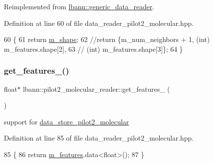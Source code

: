 Reimplemented from \hyperlink{classlbann_1_1generic__data__reader_ae06ff27459ac4a5d8ac14655d4b31318}{lbann\+::generic\+\_\+data\+\_\+reader}.



Definition at line 60 of file data\+\_\+reader\+\_\+pilot2\+\_\+molecular.\+hpp.


\begin{DoxyCode}
60                                                       \{
61     \textcolor{keywordflow}{return} \hyperlink{classlbann_1_1pilot2__molecular__reader_ae02769bc68f1e079c740f724ec6bd0c0}{m\_shape};
62     \textcolor{comment}{//return \{m\_num\_neighbors + 1, (int) m\_features.shape[2],}
63     \textcolor{comment}{//    (int) m\_features.shape[3]\};}
64   \}
\end{DoxyCode}
\mbox{\label{classlbann_1_1pilot2__molecular__reader_a5d3bef36247e9279dc237826ac5ff322}} 
\subsubsection{\texorpdfstring{get\+\_\+features\+\_()}{get\_features\_4()}}
{\footnotesize\ttfamily float$\ast$ lbann\+::pilot2\+\_\+molecular\+\_\+reader\+::get\+\_\+features\+\_ (\begin{DoxyParamCaption}{ }\end{DoxyParamCaption})\hspace{0.3cm}{\ttfamily [inline]}}



support for \hyperlink{classlbann_1_1data__store__pilot2__molecular}{data\+\_\+store\+\_\+pilot2\+\_\+molecular} 



Definition at line 85 of file data\+\_\+reader\+\_\+pilot2\+\_\+molecular.\+hpp.


\begin{DoxyCode}
85                            \{
86     \textcolor{keywordflow}{return} \hyperlink{classlbann_1_1pilot2__molecular__reader_a6b273890ecd01754e21be87da68b57bc}{m\_features}.data<\textcolor{keywordtype}{float}>();
87   \}
\end{DoxyCode}
\mbox{\label{classlbann_1_1pilot2__molecular__reader_a6694fec3678fd8a883d5d8de6c2c74d5}} 
